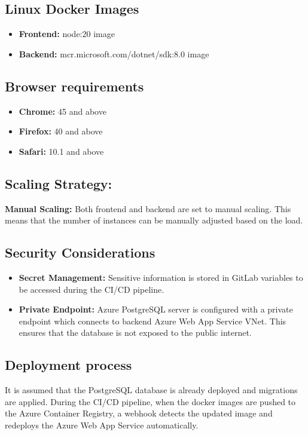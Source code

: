 \documentclass[
    english, %
]{VUMIFPSkursinis}
\begin{document}
\subsection{Linux Docker Images}
\begin{itemize}
    \item \textbf{Frontend:} node:20 image
    \item \textbf{Backend:} mcr.microsoft.com/dotnet/sdk:8.0 image
\end{itemize}

\subsection{Browser requirements}
\begin{itemize}
    \item \textbf{Chrome:} 45 and above
    \item \textbf{Firefox:} 40 and above
    \item \textbf{Safari:} 10.1 and above
\end{itemize}

\subsection{Scaling Strategy:}
\textbf{Manual Scaling:} Both frontend and backend are set to manual scaling. This means that the number of instances can be manually adjusted based on the load.

\subsection{Security Considerations}
\begin{itemize}
    \item \textbf{Secret Management:} Sensitive information is stored in GitLab variables to be accessed during the CI/CD pipeline.
    \item \textbf{Private Endpoint:} Azure PostgreSQL server is configured with a private endpoint which connects to backend Azure Web App Service VNet. This ensures that the database is not exposed to the public internet.
\end{itemize}

\subsection{Deployment process}

It is assumed that the PostgreSQL database is already deployed and migrations are applied. During the CI/CD pipeline, when the docker images are pushed to the Azure Container Registry, a webhook detects the updated image and redeploys the Azure Web App Service automatically.
\end{document}
